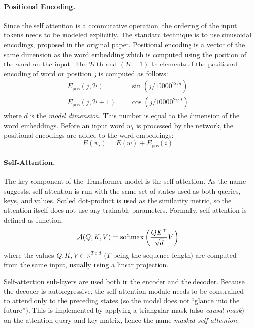 \paragraph{Positional Encoding.} Since the self attention is a commutative
operation, the ordering of the input tokens needs to be modeled explicitly.
The standard technique is to use sinusoidal encodings, proposed in the original
paper. Positional encoding is a vector of the same dimension as the word
embedding which is computed using the position of the word on the input.
The $2i$-th and $(2i+1)$-th elements of the positional encoding of word on
position $j$ is computed as follows:
%
\begin{equation}
  \begin{split}
    E_{\text{pos}}(j, 2i) &= \sin(j / 10000^{2i/d}) \\
    E_{\text{pos}}(j, 2i + 1) &= \cos(j / 10000^{2i/d})
  \end{split}
\end{equation}
%
where $d$ is the \emph{model dimension}. This number is equal to the dimension
of the word embeddings. Before an input word $w_i$ is processed by the network,
the positional encodings are added to the word embeddings:
\begin{equation}
  E(w_i) = E(w) + E_{\text{pos}}(i)
\end{equation}

\paragraph{Self-Attention.} The key component of the Transformer model is the
self-attention. As the name suggests, self-attention is run with the same set
of states used as both queries, keys, and values. Scaled dot-product is used as
the similarity metric, so the attention itself does not use any trainable
parameters. Formally, self-attention is defined as function:
%
\begin{equation}
  \mathcal{A}(Q,K,V) = \operatorname*{softmax} \left( \frac{QK^\top}{\sqrt{d}} V  \right)
  \label{eq:scaled-dot-product}
\end{equation}
%
where the values $Q, K, V \in \mathbb{R}^{T \times d}$ ($T$ being the sequence
length) are computed from the same input, usually using a linear projection.

Self-attention sub-layers are used both in the encoder and the decoder. Because
the decoder is autoregressive, the self-attention module needs to be
constrained to attend only to the preceding states (so the model does not
``glance into the future''). This is implemented by applying a triangular mask
(also \emph{causal mask}) on the attention query and key matrix, hence the name
\emph{masked self-attetnion}.

